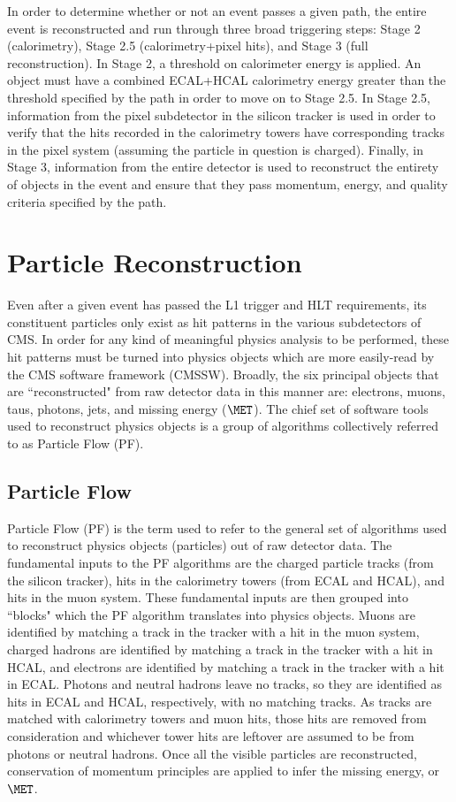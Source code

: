 In order to determine whether or not an event passes a given path, the entire event is reconstructed and run through three broad triggering steps: Stage 2 (calorimetry), Stage 2.5 (calorimetry+pixel hits), and Stage 3 (full reconstruction). In Stage 2, a threshold on calorimeter energy is applied. An object must have a combined ECAL+HCAL calorimetry energy greater than the threshold specified by the path in order to move on to Stage 2.5. In Stage 2.5, information from the pixel subdetector in the silicon tracker is used in order to verify that the hits recorded in the calorimetry towers have corresponding tracks in the pixel system (assuming the particle in question is charged). Finally, in Stage 3, information from the entire detector is used to reconstruct the entirety of objects in the event and ensure that they pass momentum, energy, and quality criteria specified by the path. 



\section{Particle Reconstruction}

Even after a given event has passed the L1 trigger and HLT requirements, its constituent particles only exist as hit patterns in the various subdetectors of CMS. In order for any kind of meaningful physics analysis to be performed, these hit patterns must be turned into physics objects which are more easily-read by the CMS software framework (CMSSW). Broadly, the six principal objects that are ``reconstructed" from raw detector data in this manner are: electrons, muons, taus, photons, jets, and missing energy ($\MET$). The chief set of software tools used to reconstruct physics objects is a group of algorithms collectively referred to as Particle Flow (PF).

\subsection{Particle Flow}

Particle Flow (PF) is the term used to refer to the general set of algorithms used to reconstruct physics objects (particles) out of raw detector data. The fundamental inputs to the PF algorithms are the charged particle tracks (from the silicon tracker), hits in the calorimetry towers (from ECAL and HCAL), and hits in the muon system. These fundamental inputs are then grouped into ``blocks" which the PF algorithm translates into physics objects. Muons are identified by matching a track in the tracker with a hit in the muon system, charged hadrons are identified by matching a track in the tracker with a hit in HCAL, and electrons are identified by matching a track in the tracker with a hit in ECAL. Photons and neutral hadrons leave no tracks, so they are identified as hits in ECAL and HCAL, respectively, with no matching tracks. As tracks are matched with calorimetry towers and muon hits, those hits are removed from consideration and whichever tower hits are leftover are assumed to be from photons or neutral hadrons. Once all the visible particles are reconstructed, conservation of momentum principles are applied to infer the missing energy, or $\MET$.

